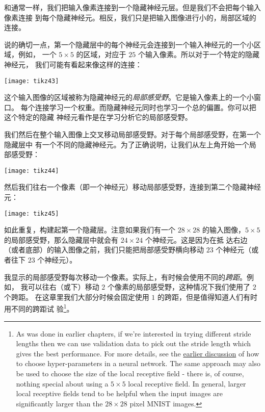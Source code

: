 和通常一样，我们把输入像素连接到一个隐藏神经元层。但是我们不会把每个输入像素连接
到每个隐藏神经元。相反，我们只是把输入图像进行小的，局部区域的连接。

说的确切一点，第一个隐藏层中的每个神经元会连接到一个输入神经元的一个小区域，例如，
一个 $5 \times 5$ 的区域，对应于 $25$ 个输入像素。所以对于一个特定的隐藏神经元，
我们可能有看起来像这样的连接：
\begin{center}
  \texttt{[image: tikz43]}
\end{center}

这个输入图像的区域被称为隐藏神经元的\emph{局部感受野}。它是输入像素上的一个小窗口。
每个连接学习一个权重。而隐藏神经元同时也学习一个总的偏置。你可以把这个特定的隐藏
神经元看作是在学习分析它的局部感受野。

我们然后在整个输入图像上交叉移动局部感受野。对于每个局部感受野，在第一个隐藏层中
有一个不同的隐藏神经元。为了正确说明，让我们从左上角开始一个局部感受野：
\begin{center}
  \texttt{[image: tikz44]}
\end{center}

然后我们往右一个像素（即一个神经元）移动局部感受野，连接到第二个隐藏神经元：
\begin{center}
  \texttt{[image: tikz45]}
\end{center}

如此重复，构建起第一个隐藏层。注意如果我们有一个 $28 \times 28$ 的输入图像，$5
\times 5$ 的局部感受野，那么隐藏层中就会有 $24 \times 24$ 个神经元。这是因为在抵
达右边（或者底部）的输入图像之前，我们只能把局部感受野横向移动 $23$ 个神经元（或
  者往下 $23$ 个神经元）。

我显示的局部感受野每次移动一个像素。实际上，有时候会使用不同的\emph{跨距}。例如，
我可以往右（或下）移动 $2$ 个像素的局部感受野，这种情况下我们使用了 $2$ 个跨距。
在这章里我们大部分时候会固定使用 $1$ 的跨距，但是值得知道人们有时用不同的跨距试
验\footnote{As was done in earlier chapters, if we're interested in trying
  different stride lengths then we can use validation data to pick out the
  stride length which gives the best performance. For more details, see the
  \hyperref[sec:how_to_choose_a_neural_network's_hyper-parameters]{earlier
    discussion} of how to choose hyper-parameters in a neural network. The same
  approach may also be used to choose the size of the local receptive field -
  there is, of course, nothing special about using a $5 \times 5$ local
  receptive field. In general, larger local receptive fields tend to be helpful
  when the input images are significantly larger than the $28 \times 28$ pixel
  MNIST images.}。\\

